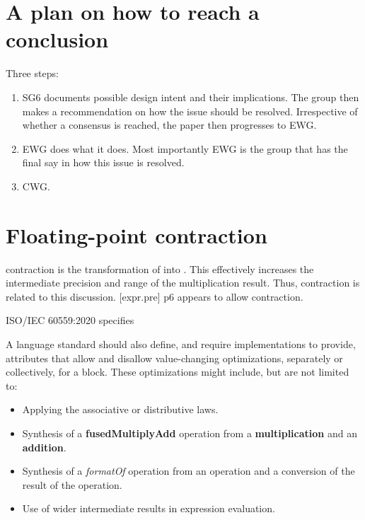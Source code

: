 \section{A plan on how to reach a conclusion}

Three steps:
\begin{enumerate}
  \item SG6 documents possible design intent and their implications.
    The group then makes a recommendation on how the issue should be resolved.
    Irrespective of whether a consensus is reached, the paper then progresses
    to EWG.

  \item EWG does what it does.
    Most importantly EWG is the group that has the final say in how this issue
    is resolved.

  \item CWG.
\end{enumerate}




\section{Floating-point contraction}\label{sec:fma}

\Fp contraction is the transformation of  into
.
This effectively increases the intermediate precision and range of the
multiplication result.
Thus, \fp contraction is related to this discussion.
[expr.pre] p6 appears to allow \fp contraction.

ISO/IEC 60559:2020 specifies
\begin{wgText}
  A language standard should also define, and require implementations to
  provide, attributes that allow and disallow value-changing optimizations,
  separately or collectively, for a block.
  These optimizations might include, but are not limited to:
  \begin{itemize}
    \item Applying the associative or distributive laws.

    \item Synthesis of a \textbf{fusedMultiplyAdd} operation from a \textbf{multiplication} and
      an \textbf{addition}.

    \item Synthesis of a \textit{formatOf} operation from an operation and a conversion
      of the result of the operation.

    \item Use of wider intermediate results in expression evaluation.
  \end{itemize}
\end{wgText}


